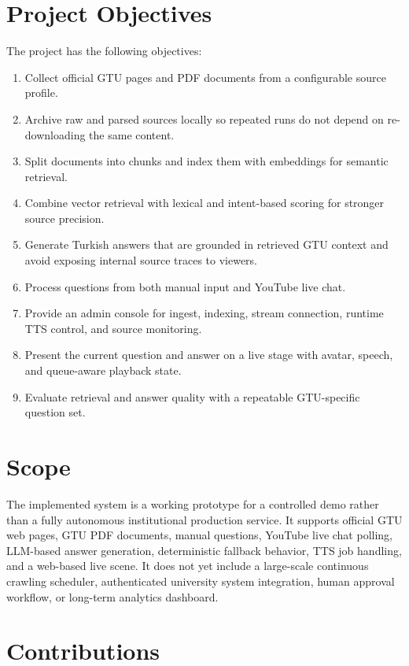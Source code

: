 \section{Project Objectives}

The project has the following objectives:

\begin{enumerate}
    \item Collect official GTU pages and PDF documents from a configurable source profile.
    \item Archive raw and parsed sources locally so repeated runs do not depend on re-downloading the same content.
    \item Split documents into chunks and index them with embeddings for semantic retrieval.
    \item Combine vector retrieval with lexical and intent-based scoring for stronger source precision.
    \item Generate Turkish answers that are grounded in retrieved GTU context and avoid exposing internal source traces to viewers.
    \item Process questions from both manual input and YouTube live chat.
    \item Provide an admin console for ingest, indexing, stream connection, runtime TTS control, and source monitoring.
    \item Present the current question and answer on a live stage with avatar, speech, and queue-aware playback state.
    \item Evaluate retrieval and answer quality with a repeatable GTU-specific question set.
\end{enumerate}

\section{Scope}

The implemented system is a working prototype for a controlled demo rather than a fully autonomous institutional production service. It supports official GTU web pages, GTU PDF documents, manual questions, YouTube live chat polling, LLM-based answer generation, deterministic fallback behavior, TTS job handling, and a web-based live scene. It does not yet include a large-scale continuous crawling scheduler, authenticated university system integration, human approval workflow, or long-term analytics dashboard.

\section{Contributions}

